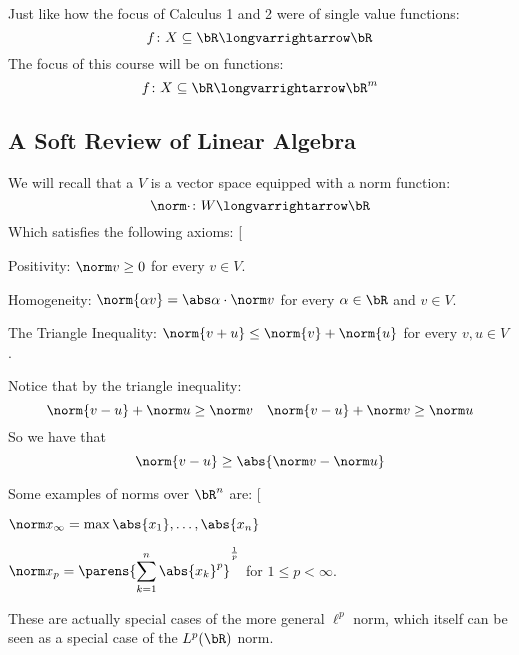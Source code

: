 \documentclass[10pt]{article}
\makeatletter
\def\@blist[#1]{%
    \bgroup\bgroup\par\vskip-\medskipamount%
    \gdef\item{%
        \par\egroup\bgroup\medskip\setbox0=\hbox{#1\quad}%
        \advance\leftskip by \wd0\leavevmode\kern-\wd0\box0%
    }%
}
\def\blist{\@ifnextchar[ \@blist {\@blist[$\bullet$]}}
\def\elist{\par\egroup\egroup\medskip}
\makeatother
\begin{document}


\bigskip

Just like how the focus of Calculus 1 and 2 were of single value functions:
\[ f\colon X\subseteq\bR\longvarrightarrow\bR \]
The focus of this course will be on functions:
\[ f\colon X\subseteq\bR\longvarrightarrow\bR^m \]

\subsection{A Soft Review of Linear Algebra}

\begin{defn*}

    We will recall that a  $V$ is a vector space equipped with a norm function:
        \[ \norm\cdot\colon W\longvarrightarrow\bR \]
    Which satisfies the following axioms:
    \blist
        \item Positivity: $\norm v\geq0$ for every $v\in V$.
        \item Homogeneity: $\norm{\alpha v}=\abs\alpha\cdot\norm v$ for every $\alpha\in\bR$ and $v\in V$.
        \item The Triangle Inequality: $\norm{v+u}\leq\norm{v}+\norm{u}$ for every $v,u\in V$.
    \elist

\end{defn*}

Notice that by the triangle inequality:
\[ \norm{v-u}+\norm u\geq\norm v \quad \norm{v-u}+\norm v\geq\norm u \]
So we have that
\[ \norm{v-u} \geq \abs{\norm v - \norm u} \]

\begin{exam}

    Some examples of norms over $\bR^n$ are:
        \blist
            \item $\norm x_\infty=\max{\abs{x_1},\dots,\abs{x_n}}$
            \item $\norm x_p=\displaystyle\parens{\sum_{k=1}^n \abs{x_k}^p}^{\frac1p}$ for $1\leq p<\infty$.
        \elist
        These are actually special cases of the more general $\ell^p$ norm, which itself can be seen as a special case of the $L^p(\bR)$ norm.

\end{exam}
\end{document}
